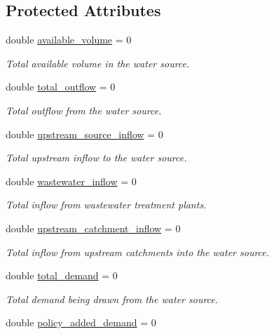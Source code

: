 \subsection*{Protected Attributes}
\begin{DoxyCompactItemize}
\item 
double \mbox{\hyperlink{classWaterSource_a49e1a191152e344e2161e8db166e067a}{available\+\_\+volume}} = 0
\begin{DoxyCompactList}\small\item\em Total available volume in the water source. \end{DoxyCompactList}\item 
double \mbox{\hyperlink{classWaterSource_a5e6992931464ed75576326b9f1bd3c4f}{total\+\_\+outflow}} = 0
\begin{DoxyCompactList}\small\item\em Total outflow from the water source. \end{DoxyCompactList}\item 
double \mbox{\hyperlink{classWaterSource_a7a69b2e9b6030f1035e6cf44d2918ee5}{upstream\+\_\+source\+\_\+inflow}} = 0
\begin{DoxyCompactList}\small\item\em Total upstream inflow to the water source. \end{DoxyCompactList}\item 
double \mbox{\hyperlink{classWaterSource_aeb5a2d2d83383a70ca20f3e94635a9c7}{wastewater\+\_\+inflow}} = 0
\begin{DoxyCompactList}\small\item\em Total inflow from wastewater treatment plants. \end{DoxyCompactList}\item 
double \mbox{\hyperlink{classWaterSource_aceb2d77612db7ba71a171848a5e03b4f}{upstream\+\_\+catchment\+\_\+inflow}} = 0
\begin{DoxyCompactList}\small\item\em Total inflow from upstream catchments into the water source. \end{DoxyCompactList}\item 
double \mbox{\hyperlink{classWaterSource_a1934917dd35a2508a5102eb5831431b7}{total\+\_\+demand}} = 0
\begin{DoxyCompactList}\small\item\em Total demand being drawn from the water source. \end{DoxyCompactList}\item 
double \mbox{\hyperlink{classWaterSource_a3f04ae75d6235117d391dece2d323890}{policy\+\_\+added\+\_\+demand}} = 0

\end{DoxyCompactItemize}
